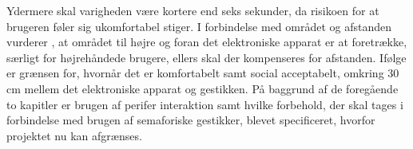 Ydermere skal varigheden være kortere end seks sekunder, da risikoen for at brugeren føler sig ukomfortabel stiger. I forbindelse med området og afstanden vurderer \textcite[s. 201]{PDF:AreYouComfortableDoingThat}, at området til højre og foran det elektroniske apparat er at foretrække, særligt for højrehåndede brugere, ellers skal der kompenseres for afstanden. Ifølge \textcite[s. 201]{PDF:AreYouComfortableDoingThat} er grænsen for, hvornår det er komfortabelt samt social acceptabelt, omkring 30 cm mellem det elektroniske apparat og gestikken.\blankline
%
På baggrund af de foregående to kapitler er brugen af perifer interaktion samt hvilke forbehold, der skal tages i forbindelse med brugen af semaforiske gestikker, blevet specificeret, hvorfor projektet nu kan afgrænses.


